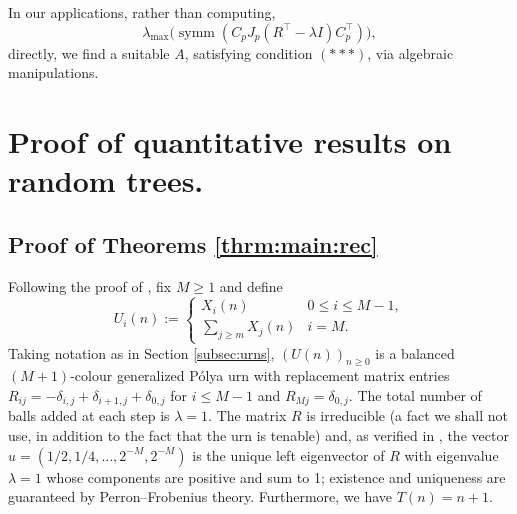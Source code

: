 \documentclass[12pt]{amsart}
\theoremstyle{definition}
\theoremstyle{remark}
\begin{document}
In our applications, rather than computing,
\[
\lambda_{\max}\bigl(\operatorname{symm}(C_p J_p(R^\top - \lambda I)
C_p^\top)\bigr),
\]
directly, we find a suitable $A$, satisfying condition $(***)$, via algebraic 
manipulations. 


\section{Proof of quantitative results on random trees.}

\subsection{Proof of Theorems \ref{thrm:main:rec} }
Following the proof of \cite[Theorem 1.1]{janson2005asymptotic}, fix $M \geq 1$ 
and define
\[
U_i(n) := \begin{cases} X_i(n) & 0 \leq i \leq M-1, \\ 
\displaystyle\sum_{j \geq m} X_j(n) & i = M. \end{cases}
\]
Taking notation as in Section \ref{subsec:urns}, $(U(n))_{n \geq 0}$ is a 
balanced $(M+1)$-colour generalized P\'{o}lya urn with replacement matrix entries
$R_{ij} = -\delta_{i,j} + \delta_{i+1,j} + \delta_{0,j}$ for $i \leq M-1$ 
and $R_{Mj} = \delta_{0,j}$. The total number of balls added at each step is 
$\lambda = 1$. The matrix $R$ is irreducible (a fact we shall not use, in addition to the fact that the urn is tenable) and, 
as verified in \cite{janson2005asymptotic}, the vector 
$u = (1/2, 1/4, \ldots, 2^{-M}, 2^{-M})$ is the unique left eigenvector of $R$ 
with eigenvalue $\lambda = 1$ whose components are positive and sum to 1; 
existence and uniqueness are guaranteed by Perron--Frobenius theory. Furthermore, we have $T(n) = n+1$.\\
\end{document}
